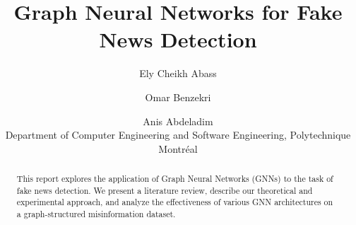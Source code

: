 \documentclass{article}
\title{Graph Neural Networks for Fake News Detection}
\author{
Ely Cheikh Abass\and
Omar Benzekri\and
Anis Abdeladim\\
\affiliations
Department of Computer Engineering and Software Engineering, Polytechnique Montréal\\
}
\begin{document}
\maketitle

\begin{abstract}
This report explores the application of Graph Neural Networks (GNNs) to the task of fake news detection. We present a literature review, describe our theoretical and experimental approach, and analyze the effectiveness of various GNN architectures on a graph-structured misinformation dataset.
\end{abstract}









\end{document}
